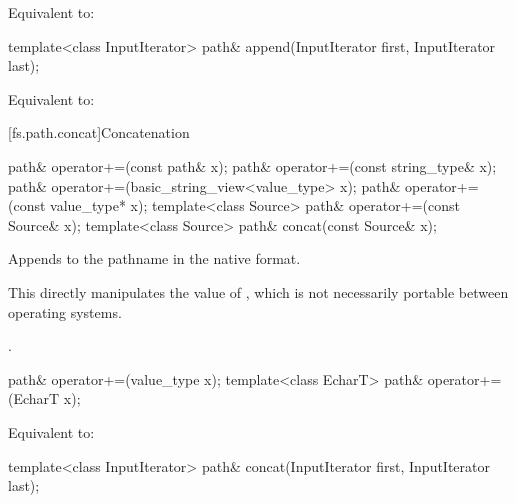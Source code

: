 \begin{itemdescr}
\pnum
\effects
Equivalent to: 
\end{itemdescr}

%
%
\begin{itemdecl}
template<class InputIterator>
  path& append(InputIterator first, InputIterator last);
\end{itemdecl}

\begin{itemdescr}
\pnum
\effects
Equivalent to: 
\end{itemdescr}

[fs.path.concat]{Concatenation}

%
%
\begin{itemdecl}
path& operator+=(const path& x);
path& operator+=(const string_type& x);
path& operator+=(basic_string_view<value_type> x);
path& operator+=(const value_type* x);
template<class Source>
  path& operator+=(const Source& x);
template<class Source>
  path& concat(const Source& x);
\end{itemdecl}

\begin{itemdescr}
\pnum
\effects
Appends  to the pathname in the native format.
\begin{note}
This directly manipulates the value of ,
which is not necessarily portable between operating systems.
\end{note}

\pnum
\returns
{}.
\end{itemdescr}

%
%
\begin{itemdecl}
path& operator+=(value_type x);
template<class EcharT>
  path& operator+=(EcharT x);
\end{itemdecl}

\begin{itemdescr}
\pnum
\effects
Equivalent to: 
\end{itemdescr}

%
\begin{itemdecl}
template<class InputIterator>
  path& concat(InputIterator first, InputIterator last);
\end{itemdecl}

